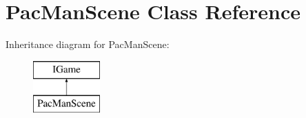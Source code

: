 \hypertarget{class_pac_man_scene}{}\section{Pac\+Man\+Scene Class Reference}
\label{class_pac_man_scene}
Inheritance diagram for Pac\+Man\+Scene\+:\begin{figure}[H]
\begin{center}
\leavevmode
\includegraphics[height=2.000000cm]{class_pac_man_scene}
\end{center}
\end{figure}
